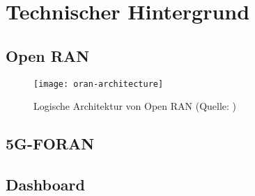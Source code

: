 \chapter{Technischer Hintergrund}
\label{chap:technischerHintergrund}
\section{Open RAN}
\label{sec:tech-oran}
\begin{figure}[H]
    \centering
    \texttt{[image: oran-architecture]}
    \caption{Logische Architektur von Open RAN (Quelle: \autocite{o-ranworkgroup1usecasesandoverallarchitectureORANArchitectureDescription})}
    \label{fig:oran-architecture}
\end{figure}
\section{5G-FORAN}
\label{sec:tech-foran}
\section{Dashboard}
\label{sec:tech-dashboard}


